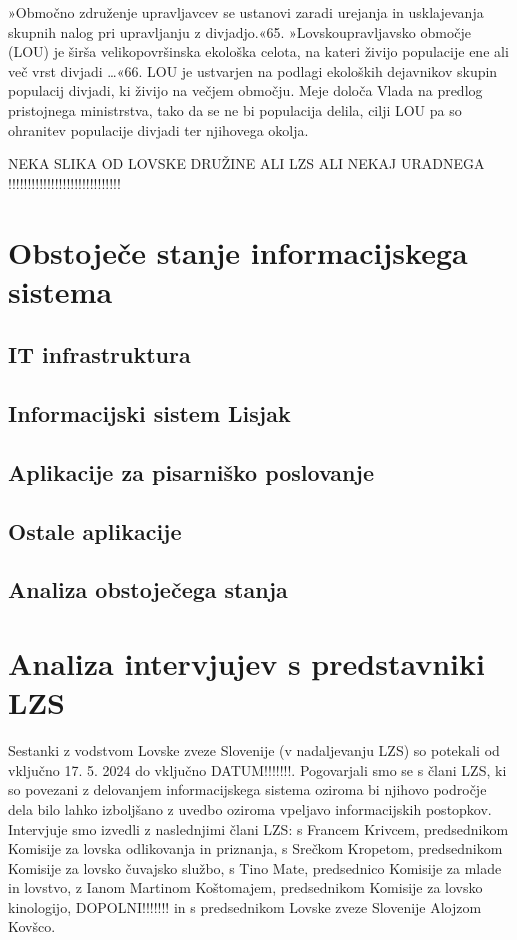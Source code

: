 \documentclass[a4paper,12pt,openright]{book}
\begin{document}
»Območno združenje upravljavcev se ustanovi zaradi urejanja in usklajevanja skupnih nalog pri upravljanju z divjadjo.«{65}.
»Lovskoupravljavsko območje (LOU) je širša velikopovršinska ekološka celota, na kateri živijo populacije ene ali več vrst divjadi …«{66}. 
LOU je ustvarjen na podlagi ekoloških dejavnikov skupin populacij divjadi, ki živijo na večjem območju. 
Meje določa Vlada na predlog pristojnega ministrstva, tako da se ne bi populacija delila, cilji LOU pa so ohranitev populacije divjadi ter njihovega okolja.

NEKA SLIKA OD LOVSKE DRUŽINE ALI LZS ALI NEKAJ URADNEGA !!!!!!!!!!!!!!!!!!!!!!!!!!!!!

\chapter{Obstoječe stanje informacijskega sistema}
\label{ch1}

\section{IT infrastruktura}

\section{Informacijski sistem Lisjak}

\section{Aplikacije za pisarniško poslovanje}

\section{Ostale aplikacije}

\section{Analiza obstoječega stanja }


\chapter{Analiza intervjujev s predstavniki LZS}
\label{ch2}

Sestanki z vodstvom Lovske zveze Slovenije (v nadaljevanju LZS) so potekali od vključno 17. 5. 2024 do vključno DATUM!!!!!!!. 
Pogovarjali smo se s člani LZS, ki so povezani z delovanjem informacijskega sistema oziroma bi njihovo področje dela bilo lahko izboljšano z uvedbo oziroma vpeljavo informacijskih postopkov.
Intervjuje smo izvedli z naslednjimi člani LZS: s Francem Krivcem, predsednikom Komisije za lovska odlikovanja in priznanja, s Srečkom Kropetom, predsednikom Komisije za lovsko čuvajsko službo, s Tino Mate, predsednico Komisije za mlade in lovstvo, z Ianom Martinom Koštomajem, predsednikom Komisije za lovsko kinologijo, DOPOLNI!!!!!!! in s predsednikom Lovske zveze Slovenije Alojzom Kovšco. 
\end{document}
